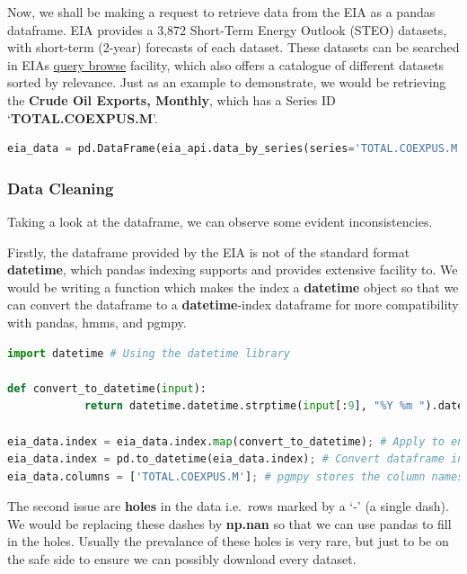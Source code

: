 Now, we shall be making a request to retrieve data from the EIA as a
pandas dataframe. EIA provides a 3,872 Short-Term Energy Outlook (STEO)
datasets, with short-term (2-year) forecasts of each dataset. These
datasets can be searched in EIAs
\href{https://www.eia.gov/opendata/qb.php}{query browse} facility, which
also offers a catalogue of different datasets sorted by relevance. Just
as an example to demonstrate, we would be retrieving the \textbf{Crude
Oil Exports, Monthly}, which has a Series ID `\textbf{TOTAL.COEXPUS.M}'.

\begin{lstlisting}[language=Python]
eia_data = pd.DataFrame(eia_api.data_by_series(series='TOTAL.COEXPUS.M')); # Convert to pandas dataframe
\end{lstlisting}

\hypertarget{data-cleaning}{%
\subsubsection{Data Cleaning}\label{data-cleaning}}

Taking a look at the dataframe, we can observe some evident
inconsistencies.

Firstly, the dataframe provided by the EIA is not of the standard format
\textbf{datetime}, which pandas indexing supports and provides extensive
facility to. We would be writing a function which makes the index a
\textbf{datetime} object so that we can convert the dataframe to a
\textbf{datetime}-index dataframe for more compatibility with pandas,
hmms, and pgmpy.

\begin{lstlisting}[language=Python]
import datetime # Using the datetime library

def convert_to_datetime(input):
            return datetime.datetime.strptime(input[:9], "%Y %m ").date();

eia_data.index = eia_data.index.map(convert_to_datetime); # Apply to entire index
eia_data.index = pd.to_datetime(eia_data.index); # Convert dataframe index to datetime64[ns] index
eia_data.columns = ['TOTAL.COEXPUS.M']; # pgmpy stores the column names as the variable name
\end{lstlisting}

The second issue are \textbf{holes} in the data i.e.~rows marked by a
`-' (a single dash). We would be replacing these dashes by
\textbf{np.nan} so that we can use pandas to fill in the holes. Usually
the prevalance of these holes is very rare, but just to be on the safe
side to ensure we can possibly download every dataset.

